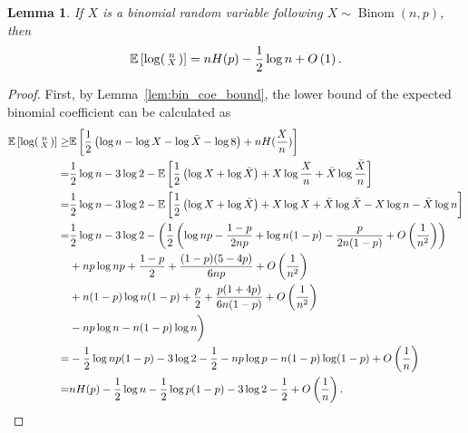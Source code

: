 \documentclass[onecolumn,romanappendices,10pt]{IEEEtran}
\newtheorem{lemma}{Lemma}
\newcommand{\EE}{{\mathbb{E}}}
\DeclareMathOperator{\Binomial}{Binom}
\begin{document}
	\begin{lemma} \label{lem:bin_coe_approx}
		If $X$ is a binomial random variable following $X \sim \Binomial(n, p)$, then
		\begin{equation}
			\begin{aligned}
				\EE \left[ \log \begin{psmallmatrix} n \\ X \end{psmallmatrix} \right] = n H(p) - \frac{1}{2} \log n + O \left( 1 \right).
			\end{aligned}
		\end{equation}
	\end{lemma}
	\begin{proof}
		First, by Lemma~\ref{lem:bin_coe_bound}, the lower bound of the expected binomial coefficient can be calculated as
		\begin{equation}
			\begin{aligned}
				\EE \left[ \log \begin{psmallmatrix} n \\ X \end{psmallmatrix} \right] \geq& \EE \left[ \frac{1}{2} \left( \log n - \log X - \log \bar{X} - \log 8 \right) + n H(\frac{X}{n}) \right] \\
				=& \frac{1}{2} \log n - 3 \log 2 - \EE \left[ \frac{1}{2} \left( \log X + \log \bar{X} \right) + X \log \frac{X}{n} + \bar{X} \log \frac{\bar{X}}{n} \right] \\
				=& \frac{1}{2} \log n - 3 \log 2 - \EE \left[ \frac{1}{2} \left( \log X + \log \bar{X} \right) + X \log X + \bar{X} \log \bar{X} - X \log n - \bar{X} \log n \right] \\
				=& \frac{1}{2} \log n - 3 \log 2 - \left( \frac{1}{2} \left( \log np - \frac{1-p}{2 np} + \log n(1 - p) - \frac{p}{2 n(1 - p)} + O \left( \frac{1}{n^2} \right) \right) \right. \\
				& + np \log np + \frac{1 - p}{2} + \frac{(1-p)(5-4p)}{6 np} + O \left( \frac{1}{n^2} \right) \\
				& + n(1 - p) \log n(1 - p) + \frac{p}{2} + \frac{p(1+4p)}{6 n (1 - p)} + O \left( \frac{1}{n^2} \right) \\
				& - np \log n - n(1 - p) \log n \bigg) \\
				=& - \frac{1}{2} \log np (1 - p) - 3 \log 2 - \frac{1}{2} - np \log p - n(1 - p) \log (1 - p) + O \left( \frac{1}{n} \right) \\
				=& n H(p) - \frac{1}{2} \log n - \frac{1}{2} \log p (1 - p) - 3 \log 2 - \frac{1}{2} + O \left( \frac{1}{n} \right).

\end{aligned}
\end{equation}
\end{proof}
\end{document}
